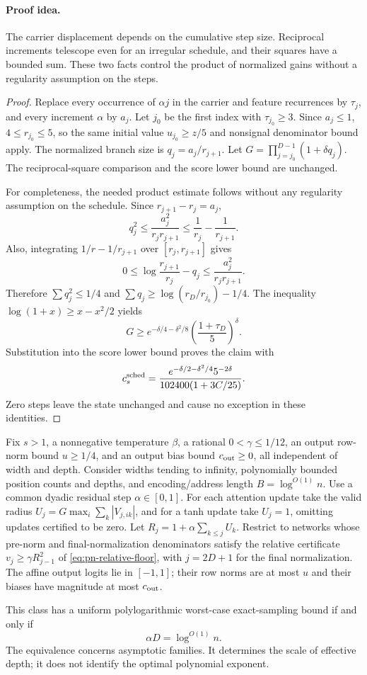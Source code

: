 \paragraph{Proof idea.}
The carrier displacement depends on the cumulative step size.
Reciprocal increments telescope even for an irregular schedule, and their
squares have a bounded sum. These two facts control the product of normalized
gains without a regularity assumption on the steps.

\begin{proof}
Replace every occurrence of $\alpha j$ in the carrier and feature
recurrences by $\tau_j$, and every increment $\alpha$ by $a_j$.
Let $j_0$ be the first index with $\tau_{j_0}\ge3$. Since $a_j\le1$,
$4\le r_{j_0}\le5$, so the same initial value $u_{j_0}\ge z/5$
and nonsignal denominator bound apply. The normalized branch size is
$q_j=a_j/r_{j+1}$. Let $G=\prod_{j=j_0}^{D-1}(1+\delta q_j)$.
The reciprocal-square comparison and the score lower bound are
unchanged.

For completeness, the needed product estimate follows without any
regularity assumption on the schedule. Since $r_{j+1}-r_j=a_j$,
\[
 q_j^2\le\frac{a_j^2}{r_jr_{j+1}}
 \le\frac1{r_j}-\frac1{r_{j+1}}.
\]
Also, integrating $1/r-1/r_{j+1}$ over $[r_j,r_{j+1}]$ gives
\[
 0\le\log\frac{r_{j+1}}{r_j}-q_j
 \le\frac{a_j^2}{r_jr_{j+1}}.
\]
Therefore $\sum q_j^2\le1/4$ and
$\sum q_j\ge\log(r_D/r_{j_0})-1/4$. The inequality
$\log(1+x)\ge x-x^2/2$ yields
\[
 G\ge e^{-\delta/4-\delta^2/8}
       \left(\frac{1+\tau_D}{5}\right)^\delta.
\]
Substitution into the score lower bound proves the claim with
\[
 c_s^{\rm sched}=\frac{e^{-\delta/2-\delta^2/4}5^{-2\delta}}
                           {102400(1+3C/25)}.
\]
Zero steps
leave the state unchanged and cause no exception in these identities.
\end{proof}

\begin{corollary}
\label{cor:pn-effective-threshold}
Fix $s>1$, a nonnegative temperature $\beta$, a rational
$0<\gamma\le1/12$, an output row-norm bound $u\ge1/4$, and an
output bias bound $c_{\rm out}\ge0$, all independent of width and depth.
Consider widths tending to infinity, polynomially
bounded position counts and depths, and encoding/address length
$B=\log^{O(1)}n$. Use a common dyadic residual step $\alpha\in[0,1]$.
For each attention update take the valid radius
$U_j=G\max_i\sum_k|V_{j,ik}|$, and for a tanh update take $U_j=1$,
omitting updates certified to be zero. Let
$R_j=1+\alpha\sum_{k\le j}U_k$. Restrict to networks whose pre-norm
and final-normalization denominators satisfy the relative certificate
$v_j\ge\gamma R_{j-1}^2$ of \eqref{eq:pn-relative-floor}, with
$j=2D+1$ for the final normalization. The affine output logits lie in $[-1,1]$;
their row norms are at most $u$ and their biases have magnitude
at most $c_{\rm out}$.

This class has a uniform polylogarithmic worst-case exact-sampling
bound if and only if
\[
 \alpha D=\log^{O(1)}n.
\]
The equivalence concerns asymptotic families. It determines the scale
of effective depth; it does not identify the optimal polynomial
exponent.
\end{corollary}
